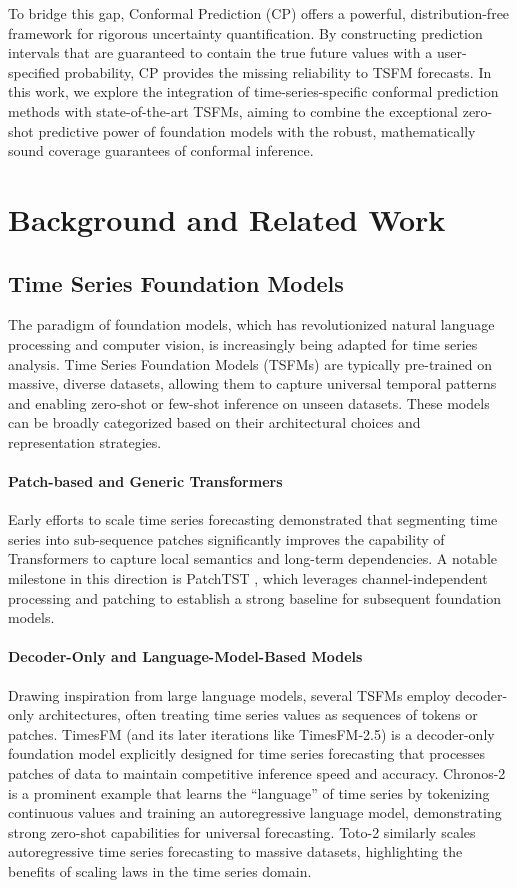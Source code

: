 \documentclass[12pt, a4paper]{article}
\begin{document}
To bridge this gap, Conformal Prediction (CP) offers a powerful, distribution-free framework for rigorous uncertainty quantification. By constructing prediction intervals that are guaranteed to contain the true future values with a user-specified probability, CP provides the missing reliability to TSFM forecasts. In this work, we explore the integration of time-series-specific conformal prediction methods with state-of-the-art TSFMs, aiming to combine the exceptional zero-shot predictive power of foundation models with the robust, mathematically sound coverage guarantees of conformal inference.

\section{Background and Related Work}

\subsection{Time Series Foundation Models}
The paradigm of foundation models, which has revolutionized natural language processing and computer vision, is increasingly being adapted for time series analysis. Time Series Foundation Models (TSFMs) are typically pre-trained on massive, diverse datasets, allowing them to capture universal temporal patterns and enabling zero-shot or few-shot inference on unseen datasets. These models can be broadly categorized based on their architectural choices and representation strategies.

\paragraph{Patch-based and Generic Transformers}
Early efforts to scale time series forecasting demonstrated that segmenting time series into sub-sequence patches significantly improves the capability of Transformers to capture local semantics and long-term dependencies. A notable milestone in this direction is PatchTST \cite{patchtst}, which leverages channel-independent processing and patching to establish a strong baseline for subsequent foundation models.

\paragraph{Decoder-Only and Language-Model-Based Models}
Drawing inspiration from large language models, several TSFMs employ decoder-only architectures, often treating time series values as sequences of tokens or patches. TimesFM \cite{timesfm} (and its later iterations like TimesFM-2.5) is a decoder-only foundation model explicitly designed for time series forecasting that processes patches of data to maintain competitive inference speed and accuracy. Chronos-2 \cite{chronos2} is a prominent example that learns the ``language'' of time series by tokenizing continuous values and training an autoregressive language model, demonstrating strong zero-shot capabilities for universal forecasting. Toto-2 \cite{toto2} similarly scales autoregressive time series forecasting to massive datasets, highlighting the benefits of scaling laws in the time series domain.
\end{document}
